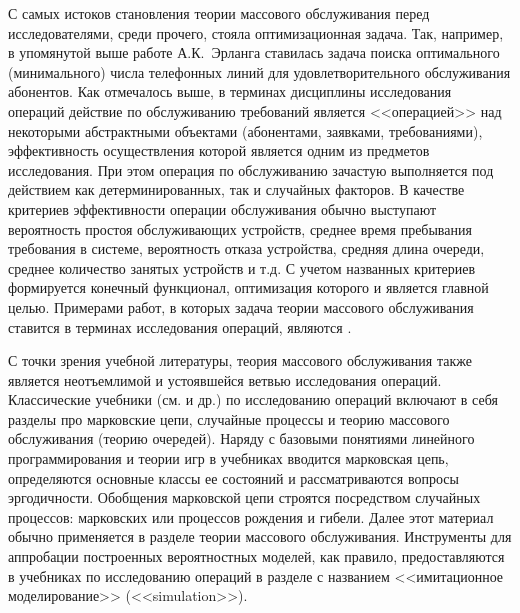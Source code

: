С самых истоков становления теории массового обслуживания перед исследователями, среди прочего, стояла оптимизационная задача. Так, например, в упомянутой выше работе А.К.~Эрланга ставилась задача поиска оптимального (минимального) числа телефонных линий для удовлетворительного обслуживания абонентов. Как отмечалось выше, в терминах дисциплины исследования операций действие по обслуживанию требований является <<операцией>> над некоторыми абстрактными объектами (абонентами, заявками, требованиями), эффективность осуществления которой является одним из предметов исследования. При этом операция по обслуживанию зачастую выполняется под действием как детерминированных, так и случайных факторов. В качестве критериев эффективности операции обслуживания обычно выступают вероятность простоя обслуживающих устройств, среднее время пребывания требования в системе, вероятность отказа устройства, средняя длина очереди, среднее количество занятых устройств и т.д. С учетом названных критериев формируется конечный функционал, оптимизация которого и является главной целью. Примерами работ, в которых задача теории массового обслуживания ставится в терминах исследования операций, являются \cite{Bailey:1957, Flagle:1962, Buslenko:1968}.

С точки зрения учебной литературы, теория массового обслуживания также является неотъемлимой и устоявшейся ветвью исследования операций. Классические учебники (см. \cite{Taha, Carter, Murthy, Hillier} и др.) по исследованию операций включают в себя разделы про марковские цепи, случайные процессы и теорию массового обслуживания (теорию очередей). Наряду с базовыми понятиями линейного программирования и теории игр в учебниках вводится марковская цепь, определяются основные классы ее состояний и рассматриваются вопросы эргодичности. Обобщения марковской цепи строятся посредством случайных  процессов: марковских или процессов рождения и гибели. Далее этот материал обычно применяется в разделе теории массового обслуживания. Инструменты для аппробации построенных вероятностных моделей, как правило, предоставляются в учебниках по исследованию операций в разделе с названием <<имитационное моделирование>> (<<simulation>>).

